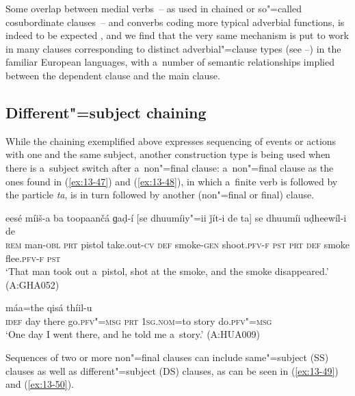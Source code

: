 Some overlap between medial verbs~-- as used in chained or so"=called cosubordinate clauses~-- and converbs coding more typical adverbial functions, is indeed to be expected \citep[26]{haspelmath1995}, and we find that the very same mechanism is put to work in many clauses corresponding to distinct adverbial"=clause types (see --) in the familiar European languages, with a~number of semantic relationships implied between the dependent clause and the main clause. 


\subsection{Different"=subject chaining}
\label{subsec:13-3-2}


While the chaining exemplified above expresses sequencing of events or actions with one and the same subject, another construction type is being used when there is a~subject switch after a~non"=final clause: a~non"=final clause as the ones found in (\ref{ex:13-47}) and (\ref{ex:13-48}), in which a~finite verb is followed by the particle \textit{ta}, is in turn followed by another (non"=final or final) clause.

\begin{exe}
\ex
\label{ex:13-47}
\gll eesé míiš-a ba toopaančá ɡaḍ-í [se dhuumíiy"=ii ǰít-i de ta] se dhuumíi uḍheewíl-i de \\
\textsc{rem} man-\textsc{obl} \textsc{prt} pistol take.out-\textsc{cv} \textsc{def}  smoke-\textsc{gen} shoot.\textsc{pfv-f} \textsc{pst} \textsc{prt} \textsc{def} smoke flee.\textsc{pfv-f} \textsc{pst} \\
\glt `That man took out a~pistol, shot at the smoke, and the smoke disappeared.' (A:GHA052)

\ex
\label{ex:13-48}
 máa=the qisá thíil-u \\
\textsc{idef} day there go.\textsc{pfv"=msg } \textsc{prt} \textsc{1sg.nom}=to story do.\textsc{pfv"=msg}  \\
\glt `One day I went there, and he told me a~story.' (A:HUA009) 
\end{exe}

Sequences of two or more non"=final clauses can include same"=subject (SS) clauses as well as different"=subject (DS) clauses, as can be seen in (\ref{ex:13-49}) and (\ref{ex:13-50}).

